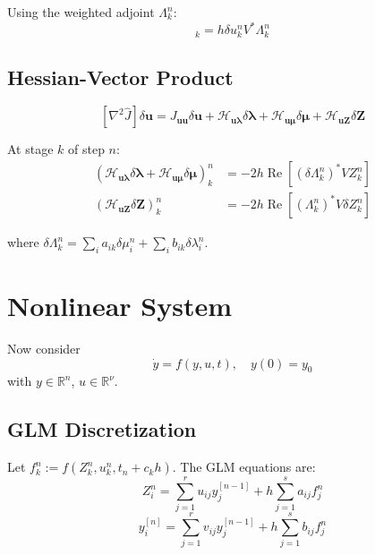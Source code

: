 \documentclass[11pt]{article}
\newcommand{\RR}{\mathbb{R}}
\newcommand{\herm}{^\ast}
\renewcommand{\Re}{\operatorname{Re}}
\newcommand{\Zv}{\mathbf{Z}}
\newcommand{\uv}{\mathbf{u}}
\newcommand{\lv}{\boldsymbol{\lambda}}
\newcommand{\mv}{\boldsymbol{\mu}}
\newcommand{\Av}{\mathcal{A}}
\newcommand{\Bv}{\mathcal{B}}
\begin{document}
Using the weighted adjoint $\Lambda_k^n$:
\begin{equation}
[(\Av'_n \delta\uv^n)\herm \mv^n - (\Bv'_n \delta\uv^n)\herm \lv^n]_k = h \delta u_k^n V\herm \Lambda_k^n
\end{equation}

\subsection{Hessian-Vector Product}

\begin{equation}
\boxed{[\nabla^2\hat{J}]\delta\uv = J_{\uv\uv}\delta\uv + \mathcal{H}_{\uv\lv}\delta\lv + \mathcal{H}_{\uv\mv}\delta\mv + \mathcal{H}_{\uv\Zv}\delta\Zv}
\end{equation}

At stage $k$ of step $n$:
\begin{align}
(\mathcal{H}_{\uv\lv}\delta\lv + \mathcal{H}_{\uv\mv}\delta\mv)_k^n &= -2h\Re\left[ (\delta\Lambda_k^n)\herm V Z_k^n \right] \\
(\mathcal{H}_{\uv\Zv}\delta\Zv)_k^n &= -2h\Re\left[ (\Lambda_k^n)\herm V \delta Z_k^n \right]
\end{align}

where $\delta\Lambda_k^n = \sum_i a_{ik}\delta\mu_i^n + \sum_i b_{ik}\delta\lambda_i^n$.

\section{Nonlinear System}

Now consider
\begin{equation}
\dot{y} = f(y, u, t), \quad y(0) = y_0
\end{equation}
with $y \in \RR^n$, $u \in \RR^\nu$.

\subsection{GLM Discretization}

Let $f_k^n := f(Z_k^n, u_k^n, t_n + c_k h)$. The GLM equations are:
\begin{equation}
Z_i^n = \sum_{j=1}^r u_{ij} y_j^{[n-1]} + h \sum_{j=1}^s a_{ij} f_j^n
\end{equation}
\begin{equation}
y_i^{[n]} = \sum_{j=1}^r v_{ij} y_j^{[n-1]} + h \sum_{j=1}^s b_{ij} f_j^n
\end{equation}
\end{document}
